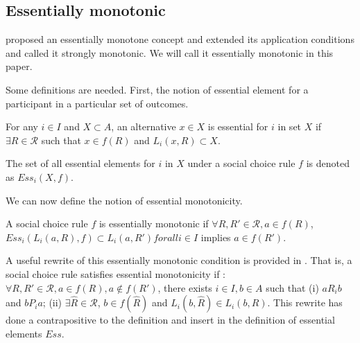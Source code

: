 
\subsection{Essentially monotonic}
\parencite{Danilov1992}  proposed an essentially monotone concept
and \parencite{Yamato1992} extended its application conditions and
called it strongly monotonic. We will call it essentially  monotonic in this
paper. 

Some definitions are needed. First, the notion of essential element
for a participant in a particular set of outcomes.

\begin{definition*}
For any $i \in I$ and $X \subset A$, an alternative $x \in X$ is
essential for $i$ in set $X$ if $\exists R \in \mathscr{R}$ such that
$x \in f(R)$ and $ L_i(x, R) \subset X$.
\end{definition*}

The set of all essential elements for $i$ in $X$ under a social choice
rule $f$ is denoted as $Ess_i(X, f)$.

We can now define the notion of essential monotonicity.

\begin{definition*}
A social choice rule $f$ is essentially monotonic if $\forall R, R' \in
\mathscr{R}, a \in f(R)$,  $Ess_i(L_i(a, R), f)
\subset L_i(a, R') for all  i \in I$ implies $a \in f(R')$. 
\end{definition*}

A useful rewrite of this essentially monotonic condition is provided
in \parencite{Yamato1992}. That is, a social choice rule satisfies essential
monotonicity if :  $\forall R, R' \in \mathscr{R}, a \in f(R), a \not
\in f(R')$,  there exists $i \in I, b \in A$ such that (i) $a R_i b$
and $b P_i a$; (ii) $\exists \hat{R} \in \mathscr{R}$, $b \in
f(\hat{R})$ and $L_i(b, \hat{R}) \in L_i(b, R)$.
This rewrite has done a contrapositive to the definition and
insert in the definition of essential elements $Ess$. 

